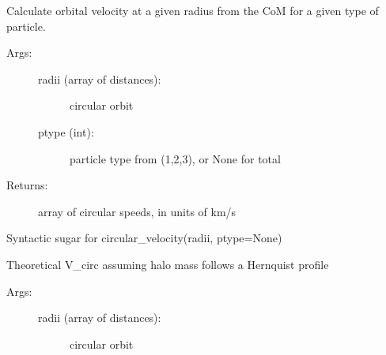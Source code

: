 \documentclass[letterpaper,10pt,english]{sphinxmanual}
\begin{document}
\begin{fulllineitems}
\begin{fulllineitems}
\label{\detokenize{massprofile:galaxy.massprofile.MassProfile.circular_velocity}}
Calculate orbital velocity at a given radius from the CoM 
for a given type of particle.
\begin{description}
\item[{Args:}] \leavevmode\begin{description}
\item[{radii (array of distances): }] \leavevmode
circular orbit

\item[{ptype (int): }] \leavevmode
particle type from (1,2,3), or None for total

\end{description}

\item[{Returns:}] \leavevmode
array of circular speeds, in units of km/s

\end{description}

\end{fulllineitems}


\begin{fulllineitems}
\label{\detokenize{massprofile:galaxy.massprofile.MassProfile.circular_velocity_total}}
Syntactic sugar for circular\_velocity(radii, ptype=None)

\end{fulllineitems}


\begin{fulllineitems}
\label{\detokenize{massprofile:galaxy.massprofile.MassProfile.circular_velocity_hernquist}}
Theoretical V\_circ assuming halo mass follows a Hernquist profile
\begin{description}
\item[{Args:}] \leavevmode\begin{description}
\item[{radii (array of distances): }] \leavevmode
circular orbit


\end{description}
\end{description}
\end{fulllineitems}
\end{fulllineitems}
\end{document}
